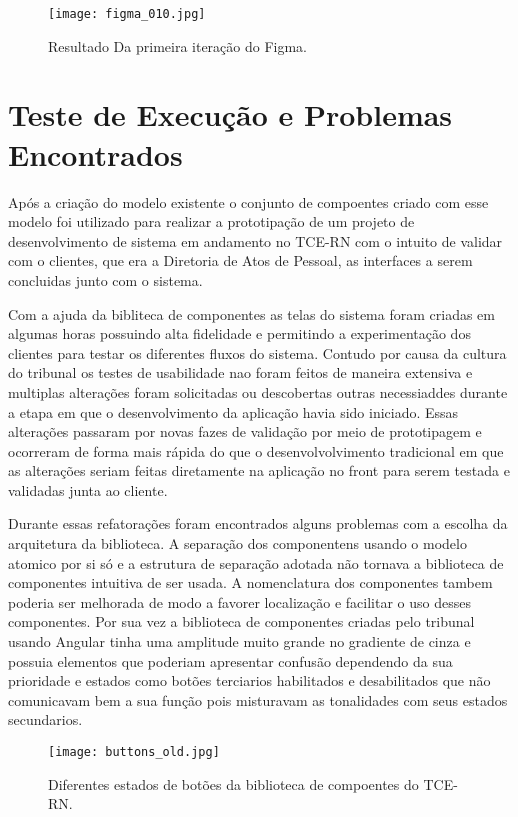   \begin{figure}[h!]
    \texttt{[image: figma\_010.jpg]}
    \caption{Resultado Da primeira iteração do Figma.}
    \label{fig:tcenglib}
  \end{figure}

\section{Teste de Execução e Problemas Encontrados} \label{secao33}

  Após a criação do modelo existente o conjunto de compoentes criado com esse modelo foi utilizado para realizar a prototipação de um projeto de desenvolvimento de sistema em andamento no TCE-RN com o intuito de validar com o clientes, que era a Diretoria de Atos de Pessoal, as interfaces a serem concluidas junto com o sistema.

  Com a ajuda da bibliteca de componentes as telas do sistema foram criadas em algumas horas possuindo alta fidelidade e permitindo a experimentação dos clientes para testar os diferentes fluxos do sistema. Contudo por causa da cultura do tribunal os testes de usabilidade nao foram feitos de maneira extensiva e multiplas alterações foram solicitadas ou descobertas outras necessiaddes durante a etapa em que o desenvolvimento da aplicação havia sido iniciado. Essas alterações passaram por novas fazes de validação por meio de prototipagem e ocorreram de forma mais rápida do que o desenvolvolvimento tradicional em que as alterações seriam feitas diretamente na aplicação no front para serem testada e validadas junta ao cliente.

  Durante essas refatorações foram encontrados alguns problemas com a escolha da arquitetura da biblioteca. A separação dos componentens usando o modelo atomico por si só e a estrutura de separação adotada não tornava a biblioteca de componentes intuitiva de ser usada. A nomenclatura dos componentes tambem poderia ser melhorada de modo a favorer localização e facilitar o uso desses componentes.
  Por sua vez a biblioteca de componentes criadas pelo tribunal usando Angular tinha uma amplitude muito grande no gradiente de cinza e possuia elementos que poderiam apresentar confusão dependendo da sua prioridade e estados como botões terciarios habilitados e desabilitados que não comunicavam bem a sua função pois misturavam as tonalidades com seus estados secundarios.

  \begin{figure}[h!]
    \texttt{[image: buttons\_old.jpg]}
    \caption{Diferentes estados de botões da biblioteca de compoentes do TCE-RN.}
    \label{fig:buttons_old}
  \end{figure}

